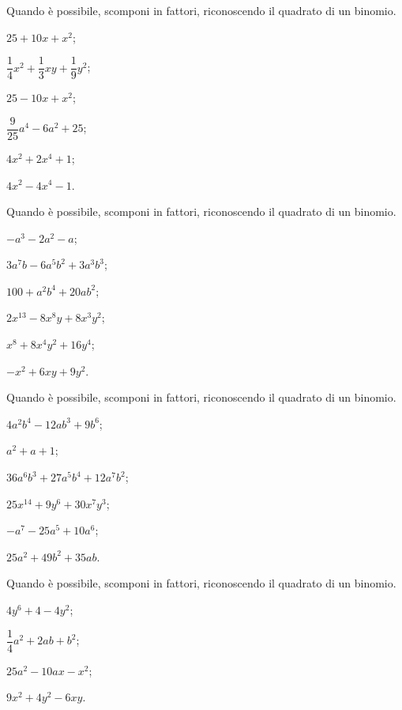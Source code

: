 \begin{multicols}{2}
\begin{esercizio}
\label{ese:16.4}
Quando è possibile, scomponi in fattori, riconoscendo il quadrato di un binomio.
\begin{enumeratea}
 \item $25+10x+x^{2}$;
 \item $\dfrac{1}{4}x^{2}+\dfrac{1}{3}xy+\dfrac{1}{9}y^{2}$;
 \item $25-10x+x^{2}$;
 \item $\dfrac{9}{25}a^{4}-6a^{2}+25$;
 \item $4x^{2}+2x^{4}+1$;
 \item $4x^{2}-4x^{4}-1$.
\end{enumeratea}
\end{esercizio}

\begin{esercizio}
\label{ese:16.5}
Quando è possibile, scomponi in fattori, riconoscendo il quadrato di un binomio.
\begin{enumeratea}
 \item $-a^{3}-2a^{2}-a$;
 \item $3a^{7}b-6a^{5}b^{2}+3a^{3}b^{3}$;
 \item $100+a^{2}b^{4}+20ab^{2}$;
 \item $2x^{13}-8x^{8}y+8x^{3}y^{2}$;
 \item $x^{8}+8x^{4}y^{2}+16y^{4}$;
 \item $-x^{2}+6{xy}+9y^{2}$.
\end{enumeratea}
\end{esercizio}

\begin{esercizio}
\label{ese:16.6}
Quando è possibile, scomponi in fattori, riconoscendo il quadrato di un binomio.
\begin{enumeratea}
 \item $4a^{2}b^{4}-12ab^{3}+9b^{6}$;
 \item $a^{2}+a+1$;
 \item $36a^{6}b^{3}+27a^{5}b^{4}+12a^{7}b^{2}$;
 \item $25x^{14}+9y^{6}+30x^{7}y^{3}$;
 \item $-a^{7}-25a^{5}+10a^{6}$;
 \item $25a^{2}+49b^{2}+35ab$.
\end{enumeratea}
\end{esercizio}

\begin{esercizio}
\label{ese:16.7}
Quando è possibile, scomponi in fattori, riconoscendo il quadrato di un binomio.
\begin{enumeratea}
 \item $4y^{6}+4-4y^{2}$;
 \item $\dfrac{1}{4}a^{2}+2ab+b^{2}$;
 \item $25a^{2}-10{ax}-x^{2}$;
 \item $9x^{2}+4y^{2}-6{xy}$.
\end{enumeratea}
\end{esercizio}
\end{multicols}

